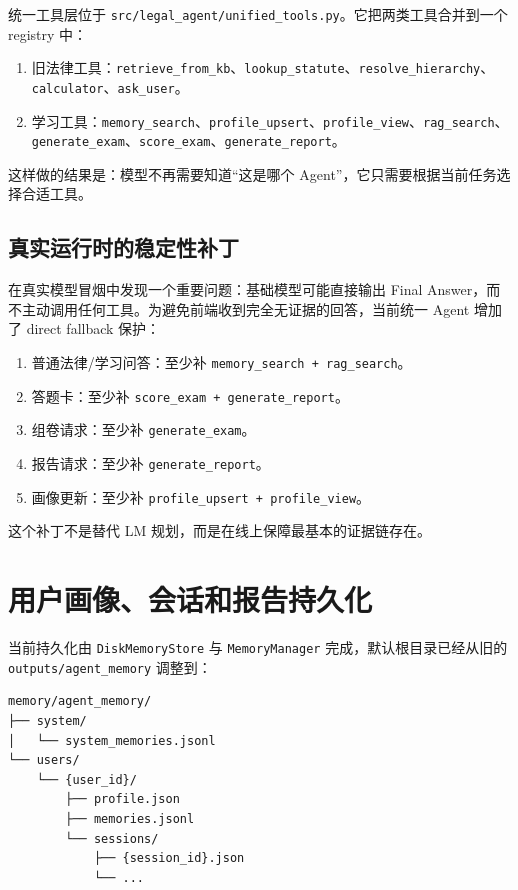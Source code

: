 \documentclass[12pt]{ctexart}
\begin{document}
统一工具层位于 \texttt{src/legal\_agent/unified\_tools.py}。它把两类工具合并到一个 registry 中：

\begin{enumerate}
  \item 旧法律工具：\texttt{retrieve\_from\_kb}、\texttt{lookup\_statute}、\texttt{resolve\_hierarchy}、\texttt{calculator}、\texttt{ask\_user}。
  \item 学习工具：\texttt{memory\_search}、\texttt{profile\_upsert}、\texttt{profile\_view}、\texttt{rag\_search}、\texttt{generate\_exam}、\texttt{score\_exam}、\texttt{generate\_report}。
\end{enumerate}

这样做的结果是：模型不再需要知道“这是哪个 Agent”，它只需要根据当前任务选择合适工具。

\subsection{真实运行时的稳定性补丁}

在真实模型冒烟中发现一个重要问题：基础模型可能直接输出 Final Answer，而不主动调用任何工具。为避免前端收到完全无证据的回答，当前统一 Agent 增加了 direct fallback 保护：

\begin{enumerate}
  \item 普通法律/学习问答：至少补 \texttt{memory\_search + rag\_search}。
  \item 答题卡：至少补 \texttt{score\_exam + generate\_report}。
  \item 组卷请求：至少补 \texttt{generate\_exam}。
  \item 报告请求：至少补 \texttt{generate\_report}。
  \item 画像更新：至少补 \texttt{profile\_upsert + profile\_view}。
\end{enumerate}

这个补丁不是替代 LM 规划，而是在线上保障最基本的证据链存在。

\section{用户画像、会话和报告持久化}

当前持久化由 \texttt{DiskMemoryStore} 与 \texttt{MemoryManager} 完成，默认根目录已经从旧的 \texttt{outputs/agent\_memory} 调整到：

\begin{lstlisting}[language=bash]
memory/agent_memory/
├── system/
│   └── system_memories.jsonl
└── users/
    └── {user_id}/
        ├── profile.json
        ├── memories.jsonl
        └── sessions/
            ├── {session_id}.json
            └── ...
\end{lstlisting}
\end{document}
